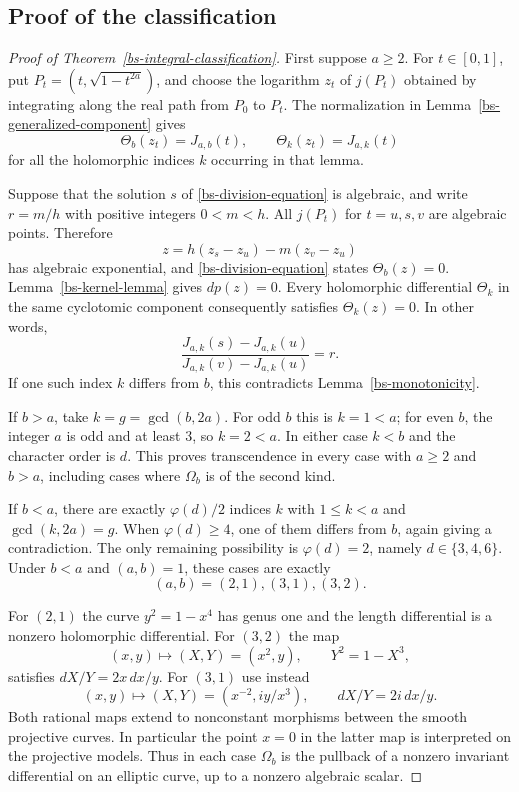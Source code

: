 \documentclass[11pt,a4paper]{article}
\theoremstyle{definition}
\theoremstyle{remark}
\numberwithin{equation}{section}
\begin{document}
\subsection{Proof of the classification}

\begin{proof}[Proof of Theorem~\ref{bs-integral-classification}]
First suppose $a\ge2$.  For $t\in[0,1]$, put
$P_t=(t,\sqrt{1-t^{2a}})$, and choose the logarithm $z_t$ of $j(P_t)$
obtained by integrating along the real path from $P_0$ to $P_t$.
The normalization in Lemma~\ref{bs-generalized-component} gives
\[
 \Theta_b(z_t)=J_{a,b}(t),\qquad
 \Theta_k(z_t)=J_{a,k}(t)
\]
for all the holomorphic indices $k$ occurring in that lemma.

Suppose that the solution $s$ of \eqref{bs-division-equation} is
algebraic, and write $r=m/h$ with positive integers $0<m<h$.
All $j(P_t)$ for $t=u,s,v$ are algebraic points.  Therefore
\[
 z=h(z_s-z_u)-m(z_v-z_u)
\]
has algebraic exponential, and \eqref{bs-division-equation} states
$\Theta_b(z)=0$.  Lemma~\ref{bs-kernel-lemma} gives $dp(z)=0$.
Every holomorphic differential $\Theta_k$ in the same cyclotomic
component consequently satisfies $\Theta_k(z)=0$.  In other words,
\begin{equation}
 \frac{J_{a,k}(s)-J_{a,k}(u)}{J_{a,k}(v)-J_{a,k}(u)}=r.
 \label{bs-forced-other-fraction}
\end{equation}
If one such index $k$ differs from $b$, this contradicts
Lemma~\ref{bs-monotonicity}.

If $b>a$, take $k=g=\gcd(b,2a)$.  For odd $b$ this is $k=1<a$;
for even $b$, the integer $a$ is odd and at least $3$, so $k=2<a$.
In either case $k<b$ and the character order is $d$.  This proves
transcendence in every case with $a\ge2$ and $b>a$, including cases
where $\Omega_b$ is of the second kind.

If $b<a$, there are exactly $\varphi(d)/2$ indices $k$ with
$1\le k<a$ and $\gcd(k,2a)=g$.  When $\varphi(d)\ge4$,
one of them differs from $b$, again giving a contradiction.  The only
remaining possibility is $\varphi(d)=2$, namely $d\in\{3,4,6\}$.
Under $b<a$ and $(a,b)=1$, these cases are exactly
\[
 (a,b)=(2,1),(3,1),(3,2).
\]

For $(2,1)$ the curve $y^2=1-x^4$ has genus one and the length
differential is a nonzero holomorphic differential.  For $(3,2)$ the
map
\[
 (x,y)\longmapsto(X,Y)=(x^2,y),\qquad Y^2=1-X^3,
\]
satisfies $dX/Y=2x\,dx/y$.  For $(3,1)$ use instead
\[
 (x,y)\longmapsto(X,Y)=(x^{-2},iy/x^3),\qquad
 dX/Y=2i\,dx/y.
\]
Both rational maps extend to nonconstant morphisms between the smooth
projective curves.  In particular the point $x=0$ in the latter map
is interpreted on the projective models.  Thus in each case
$\Omega_b$ is the pullback of a nonzero invariant differential on an
elliptic curve, up to a nonzero algebraic scalar.


\end{proof}
\end{document}

